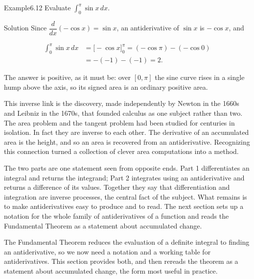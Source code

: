 \documentclass[a4paper,12pt,oneside]{memoir}
\begin{document}
\begin{workedexample}
\begin{envexample}{Example}{6.12}{}
Evaluate \(\displaystyle\int_{0}^{\pi} \sin x\,dx\).
\end{envexample}
\begin{envsolution}{Solution}{}{}
Since \(\dfrac{d}{dx}(-\cos x) = \sin x\), an antiderivative of \(\sin x\) is \(-\cos x\), and

\[ \begin{aligned}
          \int_{0}^{\pi} \sin x\,dx &= \bigl[-\cos x\bigr]_{0}^{\pi}
                                     = (-\cos \pi) - (-\cos 0) \\[2pt]
                                    &= -(-1) - (-1) = 2.
        \end{aligned} \]

The answer is positive, as it must be: over \([0, \pi]\) the sine curve rises in a single hump above the axis, so its signed area is an ordinary positive area. \qedmark
\end{envsolution}
\end{workedexample}
This inverse link is the discovery, made independently by Newton in the 1660s and Leibniz in the 1670s, that founded calculus as one subject rather than two. The area problem and the tangent problem had been studied for centuries in isolation. In fact they are inverse to each other. The derivative of an accumulated area is the height, and so an area is recovered from an antiderivative. Recognizing this connection turned a collection of clever area computations into a method.

The two parts are one statement seen from opposite ends. Part 1 differentiates an integral and returns the integrand; Part 2 integrates using an antiderivative and returns a difference of its values. Together they say that differentiation and integration are inverse processes, the central fact of the subject. What remains is to make antiderivatives easy to produce and to read. The next section sets up a notation for the whole family of antiderivatives of a function and reads the Fundamental Theorem as a statement about accumulated change.


The Fundamental Theorem reduces the evaluation of a definite integral to finding an antiderivative, so we now need a notation and a working table for antiderivatives. This section provides both, and then rereads the theorem as a statement about accumulated change, the form most useful in practice.
\end{document}
